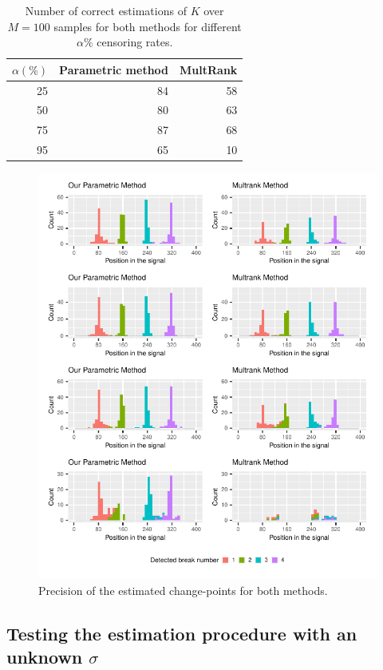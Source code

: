 \begin{table}[ht]
\centering
\begin{tabular}{|r|r|r|}
  \hline
   $\alpha(\%)$  & Parametric method & MultRank \\ 
  \hline
 25 &  84 &  58 \\ 
 50 &  80 &  63 \\ 
 75 &  87 &  68 \\ 
 95 &  65 &  10 \\ 
   \hline
\end{tabular}
\caption{Number of correct estimations of $K$ over $M=100$ samples for both methods for different $\alpha\%$ censoring rates.}
\label{tab:simcomp}
\end{table}

\begin{figure}[ht]
    \centering
    \includegraphics{figs/Chap4/detect_comp.pdf}
    \caption{Precision of the estimated change-points for both methods.}
    \label{fig:prec_sim}
\end{figure}


\subsection{Testing the estimation procedure with an unknown $\sigma$}\label{chp:4:4:3}


